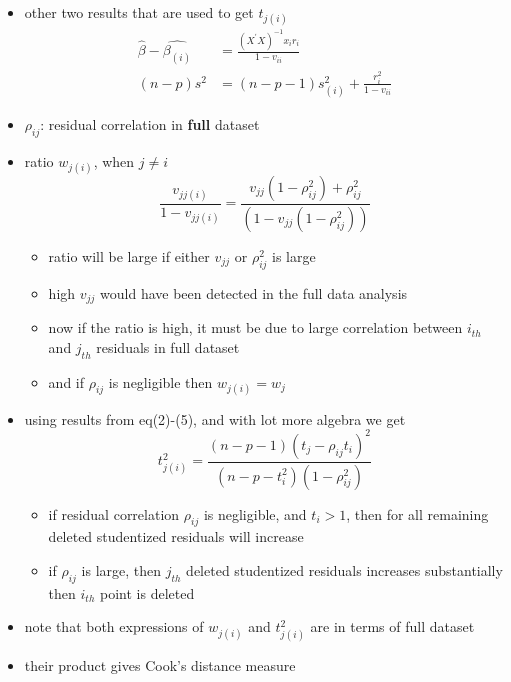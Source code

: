 \documentclass[
	11pt, %
]{beamer}
\begin{document}
\begin{frame}[allowframebreaks]
\begin{itemize}
		\item other two results that are used to get $t_{j(i)}$
		\begin{align}
			\hat{\beta}-\hat{\beta_{(i)}}&=\frac{(X^{'}X)^{-1}x_ir_i}{1-v_{ii}}\\
			(n-p)s^2&=(n-p-1)s_{(i)}^2+\frac{r_i^2}{1-v_{ii}}
		\end{align}
		\item $\rho_{ij}$: residual correlation in \textbf{full} dataset
		\item ratio $w_{j(i)}$, when $j \neq i$
		\begin{equation}
			\frac{v_{jj(i)}}{1-v_{jj(i)}}=\frac{v_{jj}(1-\rho_{ij}^2)+\rho_{ij}^2}{(1-v_{jj}(1-\rho_{ij}^2))}
		\end{equation}
		\begin{itemize}
			\item ratio will be large if either $v_{jj}$ or $\rho_{ij}^2$ is large
			\item high $v_{jj}$ would have been detected in the full data analysis
			\item now if the ratio is high, it must be due to large correlation between $i_{th}$ and $j_{th}$ residuals in full dataset
			\item and if $\rho_{ij}$ is negligible then $w_{j(i)}=w_{j}$
		\end{itemize}
		\item using results from eq(2)-(5), and with lot more algebra we get 
		\begin{equation}
			t_{j(i)}^2=\frac{(n-p-1)(t_j-\rho_{ij}t_i)^2}{(n-p-t_i^2)(1-\rho_{ij}^2)}
		\end{equation}
		\begin{itemize}
			\item if residual correlation $\rho_{ij}$ is negligible, and $t_i > 1$, then for all remaining deleted studentized residuals will increase
			\item if $\rho_{ij}$ is large, then $j_{th}$ deleted studentized residuals increases substantially then $i_{th}$ point is deleted
		\end{itemize}
		\item note that both expressions of $w_{j(i)}$ and $t_{j(i)}^2$ are in terms of full dataset
		\item their product gives Cook's distance measure
	\end{itemize}
\end{frame}
\end{document}
